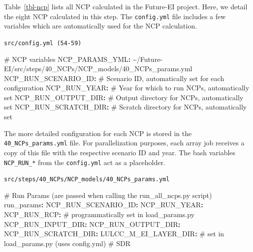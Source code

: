 \documentclass[
  letterpaper,
  DIV=11,
  numbers=noendperiod]{scrreprt}
\newenvironment{Shaded}{\begin{snugshade}}{\end{snugshade}}
\newcommand{\AttributeTok}[1]{\textcolor[rgb]{0.40,0.45,0.13}{#1}}
\newcommand{\CommentTok}[1]{\textcolor[rgb]{0.37,0.37,0.37}{#1}}
\newcommand{\FunctionTok}[1]{\textcolor[rgb]{0.28,0.35,0.67}{#1}}
\newcommand{\KeywordTok}[1]{\textcolor[rgb]{0.00,0.23,0.31}{\textbf{#1}}}
\begin{document}
Table~\ref{tbl-ncp} lists all NCP calculated in the Future-EI project.
Here, we detail the eight NCP calculated in this step. The
\texttt{config.yml} file includes a few variables which are
automatically used for the NCP calculation.

\begin{codelisting}

\caption{\texttt{src/config.yml (54-59)}}

\begin{Shaded}
\begin{Highlighting}[]
\CommentTok{  \# NCP variables}
\AttributeTok{  }\FunctionTok{NCP\_PARAMS\_YML}\KeywordTok{:}\AttributeTok{ \textasciitilde{}/Future{-}EI/src/steps/40\_NCPs/NCP\_models/40\_NCPs\_params.yml}
\AttributeTok{  }\FunctionTok{NCP\_RUN\_SCENARIO\_ID}\KeywordTok{:}\CommentTok{ \# Scenario ID, automatically set for each configuration}
\AttributeTok{  }\FunctionTok{NCP\_RUN\_YEAR}\KeywordTok{:}\CommentTok{ \# Year for which to run NCPs, automatically set}
\AttributeTok{  }\FunctionTok{NCP\_RUN\_OUTPUT\_DIR}\KeywordTok{:}\CommentTok{ \# Output directory for NCPs, automatically set}
\AttributeTok{  }\FunctionTok{NCP\_RUN\_SCRATCH\_DIR}\KeywordTok{:}\CommentTok{ \# Scratch directory for NCPs, automatically set}
\end{Highlighting}
\end{Shaded}

\end{codelisting}

The more detailed configuration for each NCP is stored in the
\texttt{40\_NCPs\_params.yml} file. For parallelization purposes, each
array job receives a copy of this file with the respective scenario ID
and year. The bash variables \texttt{NCP\_RUN\_*} from the
\texttt{config.yml} act as a placeholder.

\begin{codelisting}

\caption{\texttt{src/steps/40\_NCPs/NCP\_models/40\_NCPs\_params.yml}}

\begin{Shaded}
\begin{Highlighting}[]
\CommentTok{\# Run Params (are passed when calling the run\_all\_ncps.py script)}
\FunctionTok{run\_params}\KeywordTok{:}
\AttributeTok{  }\FunctionTok{NCP\_RUN\_SCENARIO\_ID}\KeywordTok{:}
\AttributeTok{  }\FunctionTok{NCP\_RUN\_YEAR}\KeywordTok{:}
\AttributeTok{  }\FunctionTok{NCP\_RUN\_RCP}\KeywordTok{:}\CommentTok{  \# programmatically set in load\_params.py}
\AttributeTok{  }\FunctionTok{NCP\_RUN\_INPUT\_DIR}\KeywordTok{:}
\AttributeTok{  }\FunctionTok{NCP\_RUN\_OUTPUT\_DIR}\KeywordTok{:}
\AttributeTok{  }\FunctionTok{NCP\_RUN\_SCRATCH\_DIR}\KeywordTok{:}
\AttributeTok{  }\FunctionTok{LULCC\_M\_EI\_LAYER\_DIR}\KeywordTok{:}\CommentTok{  \# set in load\_params.py (uses config.yml)  \# SDR}
\end{Highlighting}
\end{Shaded}

\end{codelisting}
\end{document}
